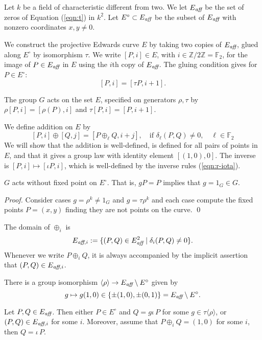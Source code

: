 \documentclass{llncs}
\newcommand{\ring}[1]{\mathbb{#1}}
\newcommand{\op}[1]{\hbox{#1}}
\newcommand{\Eaff}{E_{\op{\scriptsize\it aff}}}
\newcommand{\Eaf}[1]{E_{\op{\scriptsize\it aff},{#1}}}
\newcommand{\Eoo}{E^{\circ}} %
\newcommand{\ang}[1]{\langle{#1}\rangle}
\begin{document}
Let $k$ be a field of characteristic different from two.  We let
$\Eaff$ be the set of zeros of Equation (\ref{eqn:t}) in $k^2$.  Let
$\Eoo\subset \Eaff$ be the subset of $\Eaff$ with nonzero coordinates
$x,y\ne0$.

We construct the projective Edwards curve $E$ by taking two copies of
$\Eaff$, glued along $\Eoo$ by isomorphism $\tau$.  We write $[P,i]\in
E$, with $i\in \ring{Z}/2\ring{Z}=\ring{F}_2$, for the image of $P\in
\Eaff$ in $E$ using the $i$th copy of $\Eaff$.  The gluing condition
gives for $P\in \Eoo$:
\begin{equation}\label{eqn:glue}
[P,i]=[\tau P,i+1].
\end{equation}

The group $G$ acts on the set $E$, specified on generators $\rho,\tau$
by $\rho[P,i]=[\rho(P),i]$ and $\tau[P,i]=[P,i+1]$.

We define addition on $E$ by
\begin{equation}\label{eqn:add-proj}
[P,i]\oplus [Q,j] = [P\oplus_\ell Q,i+j],\quad 
\text{if } \delta_\ell(P,Q)\ne 0,\quad \ell\in\ring{F}_2
\end{equation}
We will show that the addition is well-defined, is defined for all
pairs of points in $E$, and that it gives a group law with identity
element $[(1,0),0]$.  The inverse is $[P,i]\mapsto [\iota P,i]$, which
is well-defined by the inverse rules (\ref{eqn:r-iota}).


\begin{lemma} \label{lemma:no-fix} $G$ acts without fixed point on
  $\Eoo$.  That is, $g P = P$ implies that $g=1_G\in G$.
\end{lemma}

\begin{proof} Consider cases $g = \rho^k\ne 1_G$
and $g=\tau\rho^k$ and each case compute the fixed points $P=(x,y)$ finding they
are not points on the curve. 
\qed\end{proof}

The domain of $\oplus_i$ is
\[
\Eaf{i} := \{(P,Q)\in \Eaff^2\mid \delta_i(P,Q)\ne0\}.
\]
Whenever we write $P\oplus_i Q$, it is always accompanied by the
implicit assertion that $(P,Q)\in \Eaf{i}$.

There is a group isomorphism $\ang{\rho}\to \Eaff\setminus\Eoo$ given by
\[
g\mapsto g(1,0)\in\{\pm (1,0),\pm (0,1)\} = \Eaff\setminus \Eoo.
\]

\begin{lemma}[dichotomy]\label{lemma:noco} 
\par
\noindent  
Let $P,Q\in \Eaff$.  Then either $P\in \Eoo$ and $Q=g \iota\, P$ for
some $g\in \tau\ang{\rho}$, or $(P,Q)\in \Eaf{i}$ for some $i$.
Moreover, assume that $P\oplus_i Q = (1,0)$ for some $i$, then $Q =
\iota\,P$.
\end{lemma}
\end{document}
